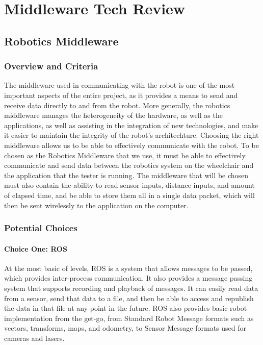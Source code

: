 \documentclass[onecolumn, draftclsnofoot,10pt, compsoc]{report}
\begin{document}
\chapter{Middleware Tech Review}
\minitoc
\section{Robotics Middleware}
\subsection{Overview and Criteria}
The middleware used in communicating with the robot is one of the most important aspects of the entire project, as it provides a means to send and receive data directly to and from the robot. More generally, the robotics middleware manages the heterogeneity of the hardware, as well as the applications, as well as assisting in the integration of new technologies, and make it easier to maintain the integrity of the robot's architechture.\cite{Robotics_Middleware} Choosing the right middleware allows us to be able to effectively communicate with the robot. To be chosen as the Robotics Middleware that we use, it must be able to effectively communicate and send data between the robotics system on the wheelchair and the application that the tester is running. The middleware that will be chosen must also contain the ability to read sensor inputs, distance inputs, and amount of elapsed time, and be able to store them all in a single data packet, which will then be sent wirelessly to the application on the computer.

\subsection{Potential Choices}

\subsubsection{Choice One: ROS}
At the most basic of levels, ROS is a system that allows messages to be passed, which provides inter-process communication. It also provides a message passing system that supports recording and playback of messages. It can easily read data from a sensor, send that data to a file, and then be able to access and republish the data in that file at any point in the future. ROS also provides basic robot implementation from the get-go, from Standard Robot Message formats such as vectors, transforms, maps, and odometry, to Sensor Message formats used for cameras and lasers.\cite{ROS_Core}
\end{document}
